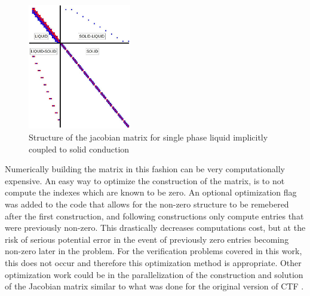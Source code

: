     \begin{figure}[!h]
    	\centering
    	\includegraphics[width=0.40\textwidth]{images/Implicit-Diagram.jpg}
    	\caption{Structure of the jacobian matrix for single phase liquid
    	implicitly coupled to solid conduction}
    	\label{fig:Implicit-Diagram}
    \end{figure}
    
    Numerically building the matrix in this fashion can be very computationally
    expensive. An easy way to optimize the construction of the matrix, is to not
    compute the indexes which are known to be zero. An optional optimization
    flag was added to the code that allows for the non-zero structure to be
    remebered after the first construction, and following constructions only
    compute entries that were previously non-zero. This drastically decreases
    computations cost, but at the risk of serious potential error in the event
    of previously zero entries becoming non-zero later in the problem. For the
    verification problems covered in this work, this does not occur and
    therefore this optimization method is appropriate. Other optimization work
    could be in the parallelization of the construction and solution of the
    Jacobian matrix similar to what was done for the original version of CTF
    \cite{Salko2014}.
   
    
    
    
    






